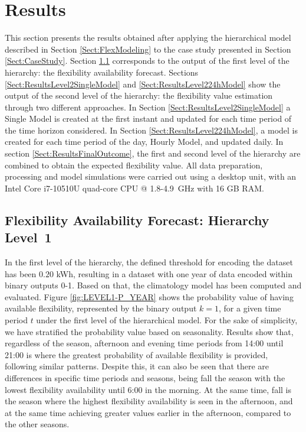 \section{Results} \label{sect:Results} 
This section presents the results obtained after applying the hierarchical model described in Section \ref{Sect:FlexModeling} to the case study presented in Section \ref{Sect:CaseStudy}. Section \ref{Sect:ResultsLevel1} corresponds to the output of the first level of the hierarchy: the flexibility availability forecast. Sections \ref{Sect:ResultsLevel2SingleModel} and \ref{Sect:ResultsLevel224hModel} show the output of the second level of the hierarchy: the flexibility value estimation through two different approaches. In Section \ref{Sect:ResultsLevel2SingleModel} a Single Model is created at the first instant and updated for each time period of the time horizon considered. In Section \ref{Sect:ResultsLevel224hModel}, a model is created for each time period of the day, Hourly Model, and updated daily. In section \ref{Sect:ResultsFinalOutcome}, the first and second level of the hierarchy are combined to obtain the expected flexibility value. All data preparation, processing and model simulations were carried out using a desktop unit, with an Intel Core i7-10510U quad-core CPU @  1.8-4.9~GHz with 16 GB RAM.

\subsection{Flexibility Availability Forecast: Hierarchy Level~1} \label{Sect:ResultsLevel1}
In the first level of the hierarchy, the defined threshold for encoding the dataset has been $0.20$ kWh, resulting in a dataset with one year of data encoded within binary outputs 0-1. Based on that, the climatology model has been computed and evaluated. 
Figure \ref{fig:LEVEL1-P_YEAR} shows the probability value of having available flexibility, represented by the binary output $k=1$, for a given time period $t$ under the first level of the hierarchical model. For the sake of simplicity, we have stratified the probability value based on seasonality. Results show that, regardless of the season, afternoon and evening time periods from 14:00 until 21:00 is where the greatest probability of available flexibility is provided, following similar patterns. Despite this, it can also be seen that there are differences in specific time periods and seasons, being fall the season with the lowest flexibility availability until 6:00 in the morning. At the same time, fall is the season where the highest flexibility availability is seen in the afternoon, and at the same time achieving greater values earlier in the afternoon, compared to the other seasons.   

